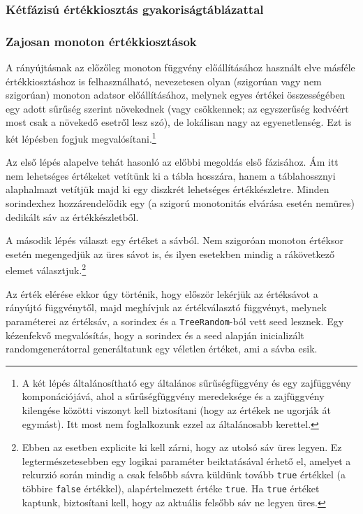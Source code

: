 \documentclass[
    parspace,
    noindent,
    nohyp,
]{elteiktdk}[2023/04/10]
\begin{document}
\subsubsection{Kétfázisú értékkiosztás gyakoriságtáblázattal}


\subsubsection{Zajosan monoton értékkiosztások}

A rányújtásnak az előzőleg monoton függvény előállításához használt elve
másféle értékkiosztáshoz is felhasználható,
nevezetesen olyan (szigorúan vagy nem szigorúan) monoton adatsor előállításához,
melynek egyes értékei összességében egy adott sűrűség szerint növekednek
(vagy csökkennek; az egyszerűség kedvéért most csak a növekedő esetről lesz szó),
de lokálisan nagy az egyenetlenség.
Ezt is két lépésben fogjuk megvalósítani.\footnote{
  A két lépés általánosítható egy általános sűrűségfüggvény és egy zajfüggvény komponációjává,
  ahol a sűrűségfüggvény meredeksége és a zajfüggvény kilengése közötti viszonyt kell biztosítani
  (hogy az értékek ne ugorják át egymást).
  Itt most nem foglalkozunk ezzel az általánosabb kerettel.
}

Az első lépés alapelve tehát hasonló az előbbi megoldás első fázisához.
Ám itt nem lehetséges értékeket vetítünk ki a tábla hosszára,
hanem a táblahossznyi alaphalmazt vetítjük majd ki egy diszkrét lehetséges értékkészletre.
Minden sorindexhez hozzárendelődik egy (a szigorú monotonitás elvárása esetén nemüres)
dedikált sáv az értékkészletből.

A második lépés választ egy értéket a sávból.
Nem szigoróan monoton értéksor esetén megengedjük az üres sávot is,
és ilyen esetekben mindig a rákövetkező elemet választjuk.\footnote{
  Ebben az esetben explicite ki kell zárni, hogy az utolsó sáv üres legyen.
  Ez legtermészetesebben egy logikai paraméter beiktatásával érhető el,
  amelyet a rekurzió során mindig a csak felsőbb sávra küldünk tovább \texttt{true} értékkel
  (a többire \texttt{false} értékkel),
  alapértelmezett értéke \texttt{true}.
  Ha \texttt{true} értéket kaptunk, biztosítani kell, hogy az aktuális felsőbb sáv ne legyen üres.
}

Az érték elérése ekkor úgy történik, hogy először lekérjük az értéksávot a rányújtó függvénytől,
majd meghívjuk az értékválasztó függvényt,
melynek paraméterei az értéksáv, a sorindex és a \texttt{TreeRandom}-ból vett seed lesznek.
Egy kézenfekvő megvalósítás,
hogy a sorindex és a seed alapján inicializált randomgenerátorral
generáltatunk egy véletlen értéket, ami a sávba esik.
\end{document}
